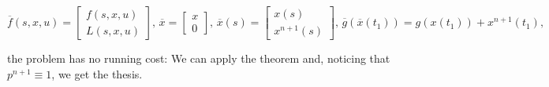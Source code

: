 \begin{equation*}
    \overline{f}(s,x,u)=\begin{bmatrix}
        f(s,x,u) \\
        L(s,x,u)
    \end{bmatrix},\,\overline{x}=\begin{bmatrix}
        x \\
        0
    \end{bmatrix},\,\overline{x}(s)=\begin{bmatrix}
        x(s) \\
        x^{n+1}(s)
    \end{bmatrix},\,\overline{g}(\overline{x}(t_1)) = g(x(t_1)) + x^{n+1}(t_1),
\end{equation*}

the problem has no running cost: We can apply the theorem and, noticing that 
$p^{n+1}\equiv1$, we get the thesis.